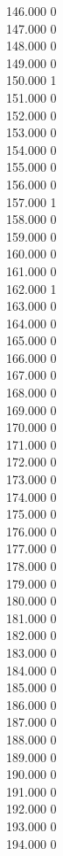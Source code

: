 { 146.000	0 \\
 147.000	0 \\
 148.000	0 \\
 149.000	0 \\
 150.000	1 \\
 151.000	0 \\
 152.000	0 \\
 153.000	0 \\
 154.000	0 \\
 155.000	0 \\
 156.000	0 \\
 157.000	1 \\
 158.000	0 \\
 159.000	0 \\
 160.000	0 \\
 161.000	0 \\
 162.000	1 \\
 163.000	0 \\
 164.000	0 \\
 165.000	0 \\
 166.000	0 \\
 167.000	0 \\
 168.000	0 \\
 169.000	0 \\
 170.000	0 \\
 171.000	0 \\
 172.000	0 \\
 173.000	0 \\
 174.000	0 \\
 175.000	0 \\
 176.000	0 \\
 177.000	0 \\
 178.000	0 \\
 179.000	0 \\
 180.000	0 \\
 181.000	0 \\
 182.000	0 \\
 183.000	0 \\
 184.000	0 \\
 185.000	0 \\
 186.000	0 \\
 187.000	0 \\
 188.000	0 \\
 189.000	0 \\
 190.000	0 \\
 191.000	0 \\
 192.000	0 \\
 193.000	0 \\
 194.000	0 \\
}
